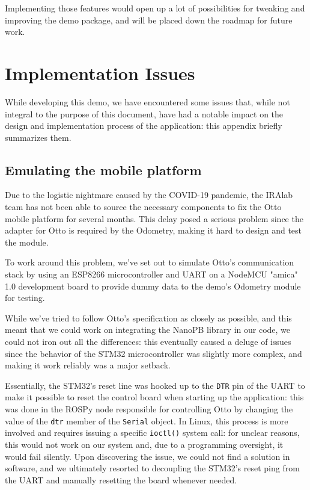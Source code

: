 \documentclass[a4paper,12pt]{report}
\begin{document}
Implementing those features would open up a lot of possibilities for tweaking and improving the demo package, and will be placed down the roadmap for future work.

\newpage
\appendix
\chapter{Implementation Issues}

While developing this demo, we have encountered some issues that, while not integral to the purpose of this document, have had a notable impact on the design and implementation process of the application: this appendix briefly summarizes them.

\section{Emulating the mobile platform}

Due to the logistic nightmare caused by the COVID-19 pandemic, the IRAlab team has not been able to source the necessary components to fix the Otto mobile platform for several months. This delay posed a serious problem since the adapter for Otto is required by the Odometry, making it hard to design and test the module.

To work around this problem, we've set out to simulate Otto's communication stack by using an ESP8266 microcontroller and UART on a NodeMCU "amica" 1.0 development board to provide dummy data to the demo's Odometry module for testing. 

While we've tried to follow Otto's specification as closely as possible, and this meant that we could work on integrating the NanoPB library in our code, we could not iron out all the differences: this eventually caused a deluge of issues since the behavior of the STM32 microcontroller was slightly more complex, and making it work reliably was a major setback.

Essentially, the STM32's reset line was hooked up to the \texttt{DTR} pin of the UART to make it possible to reset the control board when starting up the application: this was done in the ROSPy node responsible for controlling Otto by changing the value of the \texttt{dtr} member of the \texttt{Serial} object. In Linux, this process is more involved and requires issuing a specific \texttt{ioctl()} system call: for unclear reasons, this would not work on our system and, due to a programming oversight, it would fail silently.  Upon discovering the issue, we could not find a solution in software, and we ultimately resorted to decoupling the STM32's reset ping from the UART and manually resetting the board whenever needed.
\end{document}
